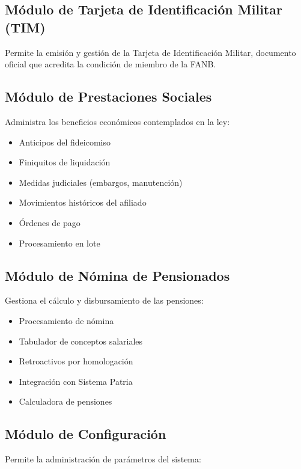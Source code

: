 \subsection{Módulo de Tarjeta de Identificación Militar (TIM)}

Permite la emisión y gestión de la Tarjeta de Identificación Militar, documento oficial que acredita la condición de miembro de la FANB.

\subsection{Módulo de Prestaciones Sociales}

Administra los beneficios económicos contemplados en la ley:

\begin{itemize}[leftmargin=*]
    \item Anticipos del fideicomiso
    \item Finiquitos de liquidación
    \item Medidas judiciales (embargos, manutención)
    \item Movimientos históricos del afiliado
    \item Órdenes de pago
    \item Procesamiento en lote
\end{itemize}

\subsection{Módulo de Nómina de Pensionados}

Gestiona el cálculo y disbursamiento de las pensiones:

\begin{itemize}[leftmargin=*]
    \item Procesamiento de nómina
    \item Tabulador de conceptos salariales
    \item Retroactivos por homologación
    \item Integración con Sistema Patria
    \item Calculadora de pensiones
\end{itemize}

\subsection{Módulo de Configuración}

Permite la administración de parámetros del sistema:

